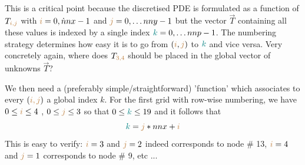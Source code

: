 \begin{minipage}[t]{\textwidth}
\\
\end{minipage}

\vspace{.5cm}

This is a critical point because the discretised PDE is formulated as a function of $T_{{\color{brown} i,j}}$ 
with ${\color{brown}i}=0,\dot nnx-1$ and ${\color{brown}j}=0,\dots nny-1$ 
but the vector $\vec{T}$ containing all these values
is indexed by a single index ${\color{teal}k}=0,\dots nnp-1$. The numbering strategy determines how easy
it is to go from $({\color{brown}i},{\color{brown}j})$ to ${\color{teal}k}$ and vice versa. 
Very concretely again, where does $T_{\color{brown}3,4}$ should be placed in the global 
vector of unknowns $\vec{T}$?

We then need a (preferably simple/straightforward) 'function' 
which associates to every $({\color{brown} i,j})$ a global index $k$. 
For the first grid with row-wise numbering, we have 
$0\leq {\color{brown}i} \leq 4$ , $0 \leq {\color{brown}j} \leq 3$ 
so that $0 \leq {\color{teal}k} \leq 19$
and it follows that 
\begin{equation}
{\color{teal} k}={\color{brown}j}*nnx+{\color{brown}i}
\end{equation}
This is easy to verify: ${\color{brown}i}=3$ and ${\color{brown}j}=2$ 
indeed corresponds to node \# 13, 
${\color{brown}i}=4$ and ${\color{brown}j}=1$ corresponds to node \# 9, etc ...

\begin{minipage}[t]{\textwidth}
\begin{center}

\end{center}
\end{minipage}





